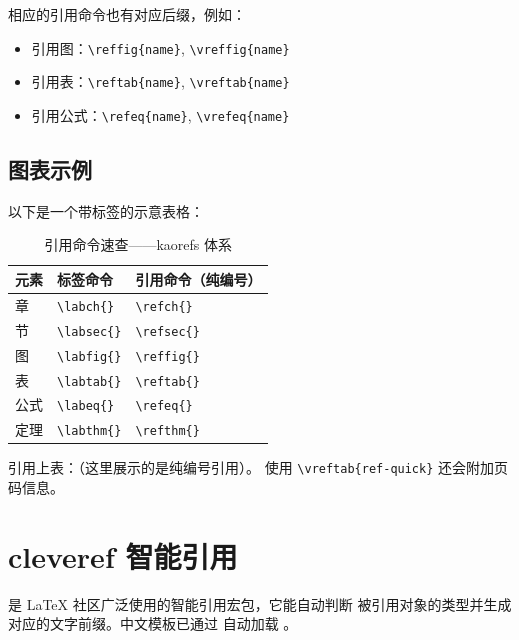 相应的引用命令也有对应后缀，例如：
\begin{itemize}
    \item 引用图：\lstinline|\reffig{name}|, \lstinline|\vreffig{name}|
    \item 引用表：\lstinline|\reftab{name}|, \lstinline|\vreftab{name}|
    \item 引用公式：\lstinline|\refeq{name}|, \lstinline|\vrefeq{name}|
\end{itemize}

\subsection{图表示例}

以下是一个带标签的示意表格：

\begin{table}[h]
\centering
\caption{引用命令速查——kaorefs 体系}
\begin{tabular}{@{}lll@{}}
\toprule
元素 & 标签命令 & 引用命令（纯编号）\\
\midrule
章 & \lstinline|\labch{}| & \lstinline|\refch{}| \\
节 & \lstinline|\labsec{}| & \lstinline|\refsec{}| \\
图 & \lstinline|\labfig{}| & \lstinline|\reffig{}| \\
表 & \lstinline|\labtab{}| & \lstinline|\reftab{}| \\
公式 & \lstinline|\labeq{}| & \lstinline|\refeq{}| \\
定理 & \lstinline|\labthm{}| & \lstinline|\refthm{}| \\
\bottomrule
\end{tabular}
\end{table}

引用上表：（这里展示的是纯编号引用）。
使用 \lstinline|\vreftab{ref-quick}| 还会附加页码信息。


\section{cleveref 智能引用}


 是 \LaTeX{} 社区广泛使用的智能引用宏包，它能自动判断
被引用对象的类型并生成对应的文字前缀。中文模板已通过
 自动加载 。

